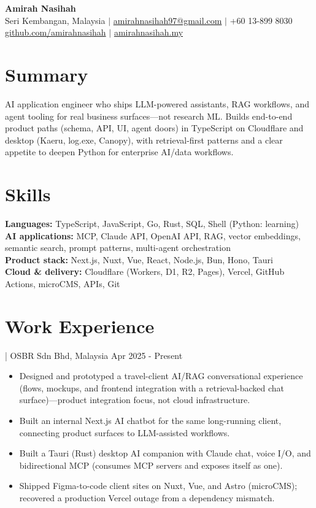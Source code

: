 \documentclass[11pt]{article}
\newcommand{\job}[4]{%
  \vspace{2pt}{\bfseries #1} | #2#3 \hfill #4\par}
\begin{document}
\begin{center}
{\LARGE\bfseries Amirah Nasihah}\\[3pt]
Seri Kembangan, Malaysia $\vert$
\href{mailto:amirahnasihah97@gmail.com}{amirahnasihah97@gmail.com} $\vert$
+60 13-899 8030\\[1pt]
\href{https://github.com/amirahnasihah}{github.com/amirahnasihah} $\vert$
\href{https://amirahnasihah.my}{amirahnasihah.my}
\end{center}

\section{Summary}
AI application engineer who ships LLM-powered assistants, RAG workflows, and
agent tooling for real business surfaces---not research ML. Builds end-to-end
product paths (schema, API, UI, agent doors) in TypeScript on Cloudflare and
desktop (Kaeru, log.exe, Canopy), with retrieval-first patterns and a clear
appetite to deepen Python for enterprise AI/data workflows.

\section{Skills}
\textbf{Languages:} TypeScript, JavaScript, Go, Rust, SQL, Shell (Python: learning)\\
\textbf{AI applications:} MCP, Claude API, OpenAI API, RAG, vector embeddings,
semantic search, prompt patterns, multi-agent orchestration\\
\textbf{Product stack:} Next.js, Nuxt, Vue, React, Node.js, Bun, Hono, Tauri\\
\textbf{Cloud \& delivery:} Cloudflare (Workers, D1, R2, Pages), Vercel,
GitHub Actions, microCMS, APIs, Git

\section{Work Experience}

\job{Jr. Frontend Developer}{OSBR Sdn Bhd}{, Malaysia}{Apr 2025 - Present}
\begin{itemize}
  \item Designed and prototyped a travel-client AI/RAG conversational experience
        (flows, mockups, and frontend integration with a retrieval-backed chat
        surface)---product integration focus, not cloud infrastructure.
  \item Built an internal Next.js AI chatbot for the same long-running client,
        connecting product surfaces to LLM-assisted workflows.
  \item Built a Tauri (Rust) desktop AI companion with Claude chat, voice I/O,
        and bidirectional MCP (consumes MCP servers and exposes itself as one).
  \item Shipped Figma-to-code client sites on Nuxt, Vue, and Astro (microCMS);
        recovered a production Vercel outage from a dependency mismatch.
\end{itemize}
\end{document}
